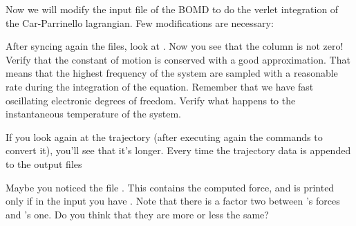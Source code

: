 \documentclass[landscape]{foils}
\begin{document}

Now we will modify the input file of the BOMD to do the verlet integration of the Car-Parrinello lagrangian. Few modifications are necessary:

After syncing again the files, look at . Now you see that the  column is not zero! Verify that the constant of motion is conserved with a good approximation. That means that the highest frequency of the system are sampled with a reasonable rate during the integration of the equation. Remember that we have fast oscillating electronic degrees of freedom. Verify what happens to the instantaneous temperature of the system.

If you look again at the trajectory (after executing again the commands to convert it), you'll see that it's longer. Every time the trajectory data is appended to the output files 

Maybe you noticed the file . This contains the computed force, and is printed only if in the input you have . Note that there is a factor two between 's forces and 's one. Do you think that they are more or less the same?

\end{document}

